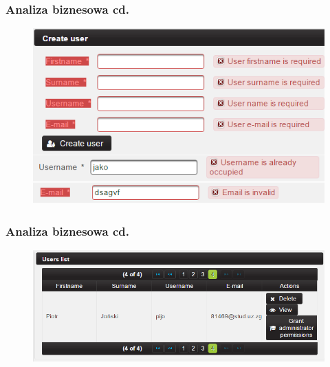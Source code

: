 \documentclass[hyperref={pdfpagelabels=false}]{beamer}
\begin{document}
\begin{frame}
	\frametitle{Analiza biznesowa cd.}
	\begin{figure}
		\centering
		\includegraphics[width=1\linewidth]{user-blad}
	\end{figure}
\end{frame}
\begin{frame}
	\frametitle{Analiza biznesowa cd.}
	\begin{figure}
		\centering
		\includegraphics[width=1\linewidth]{user-list}
	\end{figure}
\end{frame}
\end{document}
